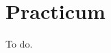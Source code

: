 \documentclass[12pt]{article} %
\begin{document}
\section{Practicum}
To do.


 









\end{document}
